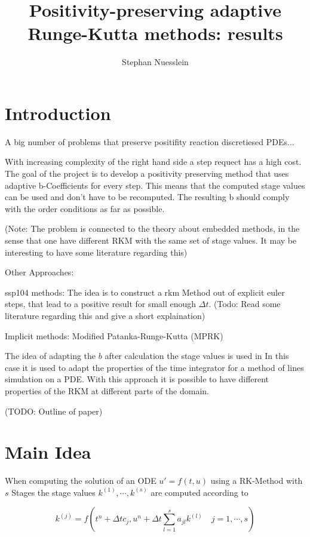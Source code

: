 \documentclass{article}
\title{Positivity-preserving adaptive Runge-Kutta methods: results}
\author{Stephan Nuesslein}
\begin{document}
\maketitle

\section{Introduction}

A big number of problems that preserve positifity reaction discretiesed PDEs...

With increasing complexity of the right hand side a step requect has a high cost. 
The goal of the project is to develop a positivity preserving method that uses adaptive b-Coefficients for every step.  This means that the computed stage values can be used and don't have to be recomputed. 
The resulting b should comply with the order conditions as far as possible.



(Note: The problem is connected to the theory about embedded methods, in the sense that one have different RKM with the same set of stage values. It may be interesting to have some literature regarding this)

Other Approaches: 


ssp104 methods: The idea is to construct a rkm Method out of explicit euler steps, that lead to a positive result for small enough $\Delta t$. (Todo: Read some literature regarding this and give a short explaination)

Implicit methods: Modified Patanka-Runge-Kutta (MPRK) \cite{kopecz_comparison_2019}

The idea of adapting the $b$ after calculation the stage values is used in \cite{ketcheson_spatially_2013}
In this case it is used to adapt the properties of the time integrator for a method of lines simulation on a PDE. With this approach it is possible to have different properties of the RKM at different parts of the domain. 


(TODO: Outline of paper)

\section{Main Idea}\label{sec:main_idea}

When computing the solution of an ODE $u ' = f(t,u) $ using a RK-Method with $s$ Stages the stage values $k^{(1)},\cdots,k^{(s)}$ are computed according to

\begin{equation}
k^{(j)} =  f(t^n + \Delta t c_j, u^n + \Delta t \sum_{l = 1}^{s} a_{jl} k^{(l)}  \quad j = 1,\cdots,s)
\end{equation}
\end{document}

